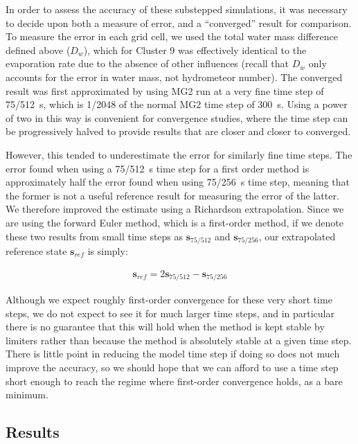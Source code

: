 \documentclass [11pt, proquest] {uwthesis}[2020/02/24]
\begin{document}
In order to assess the accuracy of these substepped simulations, it was necessary to decide upon both a measure of error, and a ``converged'' result for comparison. To measure the error in each grid cell, we used the total water mass difference defined above ($D_w$), which for Cluster 9 was effectively identical to the evaporation rate due to the absence of other influences (recall that $D_w$ only accounts for the error in water mass, not hydrometeor number). The converged result was first approximated by using MG2 run at a very fine time step of \SI{75/512}{\second}, which is \num{1/2048} of the normal MG2 time step of \SI{300}{\second}. Using a power of two in this way is convenient for convergence studies, where the time step can be progressively halved to provide results that are closer and closer to converged.

However, this tended to underestimate the error for similarly fine time steps. The error found when using a \SI{75/512}{\second} time step for a first order method is approximately half the error found when using \SI{75/256}{\second} time step, meaning that the former is not a useful reference result for measuring the error of the latter. We therefore improved the estimate using a Richardson extrapolation. Since we are using the forward Euler method, which is a first-order method, if we denote these two results from small time steps as $\mathbf{s}_{75/512}$ and $\mathbf{s}_{75/256}$, our extrapolated reference state $\mathbf{s}_{ref}$ is simply:

\begin{align}
    \mathbf{s}_{ref} = 2 \mathbf{s}_{75/512} - \mathbf{s}_{75/256}
\end{align}

Although we expect roughly first-order convergence for these very short time steps, we do not expect to see it for much larger time steps, and in particular there is no guarantee that this will hold when the method is kept stable by limiters rather than because the method is absolutely stable at a given time step. There is little point in reducing the model time step if doing so does not much improve the accuracy, so we should hope that we can afford to use a time step short enough to reach the regime where first-order convergence holds, as a bare minimum.

\subsection{Results}
\end{document}
